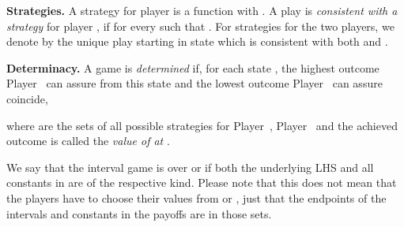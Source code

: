 \documentclass[fleqn,envcountsame]{LMCS}
\newcommand{\pzero}{Player~\xspace}
\newcommand{\pone}{Player~\xspace}
\begin{document}
\textbf{Strategies.} 
A strategy for player  is a function
 with .
A play  is \emph{consistent with a strategy} 
for player , if  for every  such that
.
For strategies  for the two players, 
we denote by  the unique
play starting in state  which is consistent with both  and
.

\textbf{Determinacy.} 
A game is \emph{determined} if, for each state , the highest outcome
\pzero can assure from this state and the lowest outcome \pone can assure
coincide,

where  are the sets of all possible strategies 
for \pzero, \pone and the achieved outcome is called the 
\emph{value of  at }.

We say that the interval game is over  or  if both
the underlying LHS and all constants in 
are of the respective kind. Please note that this does
not mean that the players have to choose their values from  or
, just that the endpoints of the intervals and constants
in the payoffs are in those sets.
\end{document}
